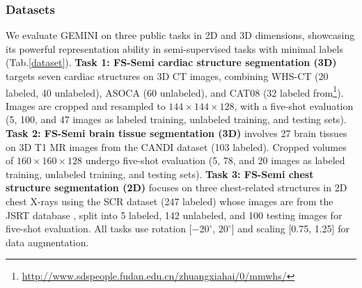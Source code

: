 \subsubsection{Datasets} We evaluate GEMINI on three public tasks in 2D and 3D dimensions, showcasing its powerful representation ability in semi-supervised tasks \cite{you2024mine,you2024rethinking} with minimal labels (Tab.\ref{dataset}). \textbf{Task 1: FS-Semi cardiac structure segmentation (3D)} targets seven cardiac structures on 3D CT images, combining WHS-CT \cite{zhuang2019evaluation} (20 labeled, 40 unlabeled), ASOCA \cite{gharleghi2022automated} (60 unlabeled), and CAT08 \cite{schaap2009standardized} (32 labeled from\footnote{\url{http://www.sdspeople.fudan.edu.cn/zhuangxiahai/0/mmwhs/}}). Images are cropped and resampled to $144\times144\times128$, with a five-shot evaluation (5, 100, and 47 images as labeled training, unlabeled training, and testing sets). \textbf{Task 2: FS-Semi brain tissue segmentation (3D)} involves 27 brain tissues on 3D T1 MR images from the CANDI dataset \cite{kennedy2012candishare} (103 labeled). Cropped volumes of $160\times160\times128$ undergo five-shot evaluation (5, 78, and 20 images as labeled training, unlabeled training, and testing sets). \textbf{Task 3: FS-Semi chest structure segmentation (2D)} focuses on three chest-related structures in 2D chest X-rays using the SCR dataset \cite{van2006segmentation} (247 labeled) whose images are from the JSRT database \cite{shiraishi2000development}, split into 5 labeled, 142 unlabeled, and 100 testing images for five-shot evaluation. All tasks use rotation [$-20^\circ$, $20^\circ$] and scaling [0.75, 1.25] for data augmentation.


